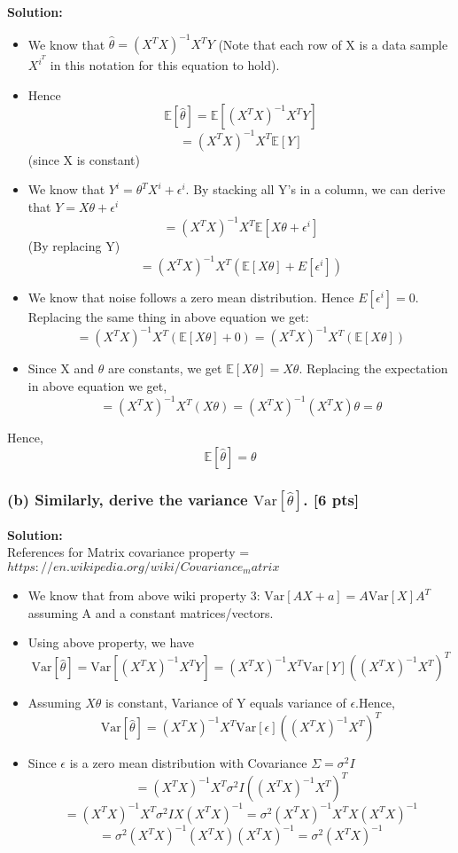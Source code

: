 \documentclass[twoside,10pt]{article}
\begin{document}
\textbf{ Solution: }\\
\begin{itemize}
\item We know that $\hat{\theta} = (X^T X)^{-1} X^T Y$  (Note that each row of X is a data sample $X^{i^T}$ in this notation for this equation to hold).
\item Hence $$\mathbb{E}[\hat{\theta}] = \mathbb{E}[(X^T X)^{-1} X^T Y]$$
$$ = (X^T X)^{-1} X^T \mathbb{E}[Y]$$ 
(since X is constant)
\item We know that $Y^i = \theta^T X^i + \epsilon^i$. By stacking all Y's in a column, we can derive that $Y = X \theta + \epsilon^i$
$$ = (X^T X)^{-1} X^T \mathbb{E}[X \theta + \epsilon^i]$$ 
(By replacing Y)
$$ = (X^T X)^{-1} X^T (\mathbb{E}[X \theta] + E[\epsilon^i])$$ 
\item We know that noise follows a zero mean distribution. Hence $E[\epsilon^i] = 0$. Replacing the same thing in above equation we get:
$$ = (X^T X)^{-1} X^T (\mathbb{E}[X \theta] + 0) = (X^T X)^{-1} X^T (\mathbb{E}[X \theta] )$$ 
\item Since X and $\theta$ are constants, we get $\mathbb{E}[X \theta]  = X \theta$. Replacing the expectation in above equation we get,
$$= (X^T X)^{-1} X^T (X \theta)  = (X^T X)^{-1} (X^T X) \theta = \theta$$
\end{itemize}
Hence,
$$\boxed{\mathbb{E}[\hat{\theta}] = \theta}$$


\newpage
\subsubsection*{(b) Similarly, derive the variance $\text{Var}[\hat{\theta}]$. [6 pts]}
\textbf{ Solution: }\\

References for Matrix covariance property           = {\href{https://en.wikipedia.org/wiki/Covariance_matrix}{$https://en.wikipedia.org/wiki/Covariance_matrix$}}
\begin{itemize}
\item We know that from above wiki property 3: $\text{Var}[AX + a] = A \text{Var}[X] A^T$ assuming A and a constant matrices/vectors.
\item Using above property, we have 
$$\text{Var}[\hat{\theta}] = \text{Var}[(X^T X)^{-1} X^T Y] = (X^T X)^{-1} X^T \text{Var}[Y] ((X^T X)^{-1} X^T)^T$$
\item Assuming $X\theta$ is constant, Variance of Y equals variance of $\epsilon$.Hence,
$$\text{Var}[\hat{\theta}] = (X^T X)^{-1} X^T \text{Var}[\epsilon] ((X^T X)^{-1} X^T)^T $$
\item Since $\epsilon$ is a zero mean distribution with Covariance $\Sigma = \sigma^2 I$
$$= (X^T X)^{-1} X^T \sigma^2 I ((X^T X)^{-1} X^T)^T $$
$$ =(X^T X)^{-1} X^T \sigma^2 I X (X^T X)^{-1} =  \sigma^2 (X^T X)^{-1} X^T X (X^T X)^{-1} $$
$$ = \sigma^2 (X^T X)^{-1} (X^T X) (X^T X)^{-1} = \sigma^2 (X^T X)^{-1}$$
\end{itemize}
\end{document}
